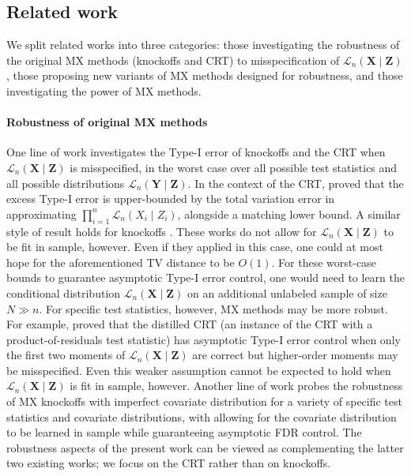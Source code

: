 \documentclass[aos]{imsart}
\theoremstyle{plain}
\theoremstyle{remark}
\newcommand{\prx}{\bm X}								%
\newcommand{\srx}{X}									%
\newcommand{\prz}{\bm Z}								%
\newcommand{\srz}{Z}									%
\newcommand{\pry}{{\bm Y}}								%
\newcommand{\law}{\mathcal L}							%
\begin{document}
\subsection{Related work}

We split related works into three categories: those investigating the robustness of the original MX methods (knockoffs and CRT) to misspecification of $\law_n(\prx \mid \prz)$, those proposing new variants of MX methods designed for robustness, and those investigating the power of MX methods. 

\paragraph*{Robustness of original MX methods}

One line of work investigates the Type-I error of knockoffs \citep{Barber2018} and the CRT \citep{Berrett2019} when $\law_n(\prx \mid \prz)$ is misspecified, in the worst case over all possible test statistics and all possible distributions $\law_n(\pry \mid \prz)$. In the context of the CRT, \citet{Berrett2019} proved that the excess Type-I error is upper-bounded by the total variation error in approximating $\prod_{i = 1}^n \law_n(\srx_i \mid \srz_i)$, alongside a matching lower bound. A similar style of result holds for knockoffs \citep{Barber2018}. These works do not allow for $\law_n(\prx \mid \prz)$ to be fit in sample, however. Even if they applied in this case, one could at most hope for the aforementioned TV distance to be $O(1)$. For these worst-case bounds to guarantee asymptotic Type-I error control, one would need to learn the conditional distribution $\law_n(\prx \mid \prz)$ on an additional unlabeled sample of size $N \gg n$. For specific test statistics, however, MX methods may be more robust. For example, \citet{Katsevich2020a} proved that the distilled CRT (an instance of the CRT with a product-of-residuals test statistic) has asymptotic Type-I error control when only the first two moments of $\law_n(\prx \mid \prz)$ are correct but higher-order moments may be misspecified. Even this weaker assumption cannot be expected to hold when $\law_n(\prx \mid \prz)$ is fit in sample, however. Another line of work \citep{Fan2018a,Fan2020,Fan2023} probes the robustness of MX knockoffs with imperfect covariate distribution for a variety of specific test statistics and covariate distributions, with \citet{Fan2018a, Fan2023} allowing for the covariate distribution to be learned in sample while guaranteeing asymptotic FDR control. The robustness aspects of the present work can be viewed as complementing the latter two existing works; we focus on the CRT rather than on knockoffs.
\end{document}
